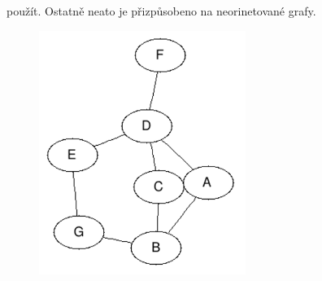 \documentclass[color,table,oneside,nolot,nolof]{fithesis}
\begin{document}
	použít. Ostatně neato je přizpůsobeno na neorinetované grafy.
\begin{figure}
	\centering
	\includegraphics[width=0.6\textwidth]{pictures/neato_example.png} 
\end{figure}
\end{document}
